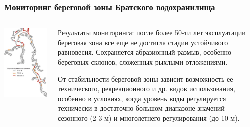 \documentclass[handout]{beamer}
\begin{document}
\begin{frame}[fragile]
  \frametitle{Мониторинг береговой зоны Братского водохранилища}
  \begin{columns}
    \begin{column}{0.4\linewidth}
      \includegraphics[width=\linewidth]{bratsk-reserv-shores.jpeg}
    \end{column}
    \begin{column}{0.6\linewidth}
      Результаты мониторинга: после более 50-ти лет эксплуатации  береговая зона все еще не достигла стадии устойчивого равновесия.  Сохраняется абразионный размыв, особенно береговых склонов, сложенных рыхлыми отложениями.

\vspace{1em}
От стабильности береговой зоны зависит возможность ее технического, рекреационного и др. видов использования, особенно в условиях, когда уровень воды регулируется технически в достаточно большом диапазоне значений сезонного (2-3 м) и многолетнего регулирования (до 10 м).
    \end{column}
  \end{columns}
\end{frame}
\end{document}
